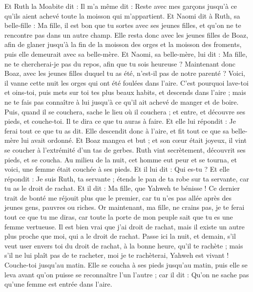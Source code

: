 \begin{multicols}{2}
Et Ruth la Moabite dit : Il m'a même dit : Reste avec mes garçons jusqu'à ce qu'ils aient achevé toute la moisson qui m'appartient.
Et Naomi dit à Ruth, sa belle-fille : Ma fille, il est bon que tu sortes avec ses jeunes filles, et qu'on ne te rencontre pas dans un autre champ.
Elle resta donc avec les jeunes filles de Boaz, afin de glaner jusqu'à la fin de la moisson des orges et la moisson des froments, puis elle demeurait avec sa belle-mère.
\VerseOne{}Et Naomi, sa belle-mère, lui dit : Ma fille, ne te chercherai-je pas du repos, afin que tu sois heureuse ?
Maintenant donc Boaz, avec les jeunes filles duquel tu as été, n'est-il pas de notre parenté ? Voici, il vanne cette nuit les orges qui ont été foulées dans l'aire.
C'est pourquoi lave-toi et oins-toi, puis mets sur toi tes plus beaux habits, et descends dans l'aire ; mais ne te fais pas connaître à lui jusqu'à ce qu'il ait achevé de manger et de boire.
Puis, quand il se couchera, sache le lieu où il couchera ; et entre, et découvre ses pieds, et couche-toi. Il te dira ce que tu auras à faire.
Et elle lui répondit : Je ferai tout ce que tu as dit.
Elle descendit donc à l'aire, et fit tout ce que sa belle-mère lui avait ordonné.
Et Boaz mangea et but ; et son cœur était joyeux, il vint se coucher à l'extrémité d'un tas de gerbes. Ruth vint secrètement, découvrit ses pieds, et se coucha.
Au milieu de la nuit, cet homme eut peur et se tourna, et voici, une femme était couchée à ses pieds.
Et il lui dit : Qui es-tu ? Et elle répondit : Je suis Ruth, ta servante ; étends le pan de ta robe sur ta servante, car tu as le droit de rachat.
Et il dit : Ma fille, que Yahweh te bénisse ! Ce dernier trait de bonté me réjouit plus que le premier, car tu n'es pas allée après des jeunes gens, pauvres ou riches.
Or maintenant, ma fille, ne crains pas, je te ferai tout ce que tu me diras, car toute la porte de mon peuple sait que tu es une femme vertueuse.
Il est bien vrai que j'ai droit de rachat, mais il existe un autre plus proche que moi, qui a le droit de rachat.
Passe ici la nuit, et demain, s'il veut user envers toi du droit de rachat, à la bonne heure, qu'il te rachète ; mais s'il ne lui plaît pas de te racheter, moi je te rachèterai, Yahweh est vivant ! Couche-toi jusqu'au matin.
Elle se coucha à ses pieds jusqu'au matin, puis elle se leva avant qu'on puisse se reconnaître l'un l'autre ; car il dit : Qu'on ne sache pas qu'une femme est entrée dans l'aire.

\end{multicols}
